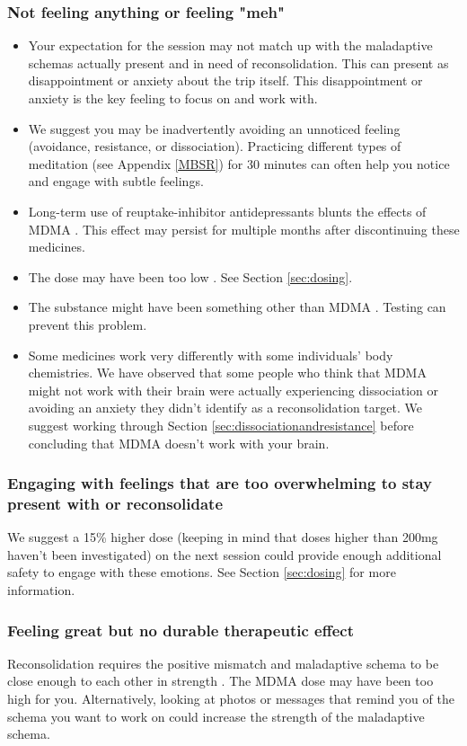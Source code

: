 \documentclass[12pt,letterpaper]{book}
\begin{document}
\subsubsection{Not feeling anything or feeling "meh"}
\begin{itemize}
    \item Your expectation for the session may not match up with the maladaptive schemas actually present and in need of reconsolidation. This can present as disappointment or anxiety about the trip itself. This disappointment or anxiety is the key feeling to focus on and work with.
    \item We suggest you may be inadvertently avoiding an unnoticed feeling (avoidance, resistance, or dissociation). Practicing different types of meditation (see Appendix \ref{MBSR}) for 30 minutes can often help you notice and engage with subtle feelings.
    \item Long-term use of reuptake-inhibitor antidepressants blunts the effects of MDMA \cite{feducciaSSRIDiscontinuation}. This effect may persist for multiple months after discontinuing these medicines.
    \item The dose may have been too low \cite{bediMDMALowDose}. See Section \ref{sec:dosing}.
    \item The substance might have been something other than MDMA \cite{saleemiAdulterants}. Testing can prevent this problem.
    \item Some medicines work very differently with some individuals' body chemistries. We have observed that some people who think that MDMA might not work with their brain were actually experiencing dissociation or avoiding an anxiety they didn't identify as a reconsolidation target. We suggest working through Section \ref{sec:dissociationandresistance} before concluding that MDMA doesn't work with your brain. 
\end{itemize}
\subsubsection{Engaging with feelings that are too overwhelming to stay present with or reconsolidate}
We suggest a 15\% higher dose (keeping in mind that doses higher than 200mg haven't been investigated) on the next session could provide enough additional safety to engage with these emotions. See Section \ref{sec:dosing} for more information.
\subsubsection{Feeling great but no durable therapeutic effect}
Reconsolidation requires the positive mismatch and maladaptive schema to be close enough to each other in strength \cite{eckerUnlocking}. The MDMA dose may have been too high for you. Alternatively, looking at photos or messages that remind you of the schema you want to work on could increase the strength of the maladaptive schema.
\end{document}
